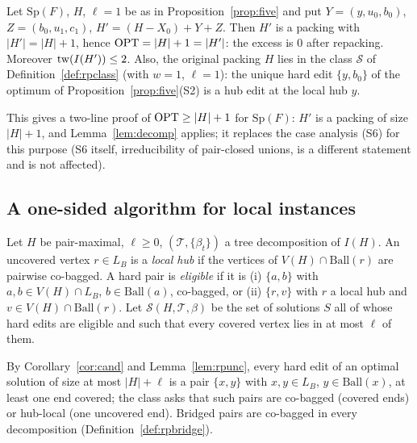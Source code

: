 \begin{proposition}\label{prop:rpSp}
Let $\mathrm{Sp}(F)$, $H$, $\ell=1$ be as in Proposition~\ref{prop:five} and put $Y=(y,u_0,b_0)$, $Z=(b_0,u_1,c_1)$, $H'=(H-X_0)+Y+Z$. Then $H'$ is a packing with $|H'|=|H|+1$, hence $\mathrm{OPT}=|H|+1=|H'|$: the excess is $0$ after repacking. Moreover $\mathrm{tw}(I(H'))\le2$. Also, the original packing $H$ lies in the class $\mathcal S$ of Definition~\ref{def:rpclass} (with $w=1$, $\ell=1$): the unique hard edit $\{y,b_0\}$ of the optimum of Proposition~\ref{prop:five}(S2) is a hub edit at the local hub $y$.
\end{proposition}
This gives a two-line proof of $\mathrm{OPT}\ge|H|+1$ for $\mathrm{Sp}(F)$: $H'$ is a packing of size $|H|+1$, and Lemma~\ref{lem:decomp} applies; it replaces the case analysis (S6) for this purpose (S6 itself, irreducibility of pair-closed unions, is a different statement and is not affected).

\subsection{A one-sided algorithm for local instances}
\begin{definition}\label{def:rpclass}
Let $H$ be pair-maximal, $\ell\ge0$, $(\mathcal T,\{\beta_t\})$ a tree decomposition of $I(H)$. An uncovered vertex $r\in L_B$ is a \emph{local hub} if the vertices of $V(H)\cap\mathrm{Ball}(r)$ are pairwise co-bagged. A hard pair is \emph{eligible} if it is (i) $\{a,b\}$ with $a,b\in V(H)\cap L_B$, $b\in\mathrm{Ball}(a)$, co-bagged, or (ii) $\{r,v\}$ with $r$ a local hub and $v\in V(H)\cap\mathrm{Ball}(r)$. Let $\mathcal S(H,\mathcal T,\beta)$ be the set of solutions $S$ all of whose hard edits are eligible and such that every covered vertex lies in at most $\ell$ of them.
\end{definition}
By Corollary~\ref{cor:cand} and Lemma~\ref{lem:rpunc}, every hard edit of an optimal solution of size at most $|H|+\ell$ is a pair $\{x,y\}$ with $x,y\in L_B$, $y\in\mathrm{Ball}(x)$, at least one end covered; the class asks that such pairs are co-bagged (covered ends) or hub-local (one uncovered end). Bridged pairs are co-bagged in every decomposition (Definition~\ref{def:rpbridge}).

